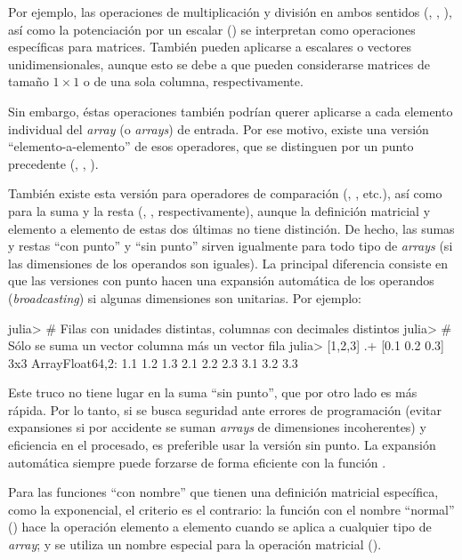 ﻿\documentclass[spanish]{article}
\begin{document}
Por ejemplo, las operaciones de multiplicación y división en ambos
sentidos (\code{*}, \code{/}, \code{\\}
), así como la potenciación por un escalar (\code{^}) se interpretan como
operaciones específicas para matrices. También pueden aplicarse a
escalares o vectores unidimensionales, aunque esto se debe a que pueden
considerarse matrices de tamaño $1\times{}1$ o de una sola columna,
respectivamente.

Sin embargo, éstas operaciones también podrían querer aplicarse a
cada elemento individual del \emph{array} (o \emph{arrays}) de entrada.
Por ese motivo, existe una versión ``elemento-a-elemento'' de
esos operadores, que se distinguen por un punto precedente (,
, ).

También existe esta versión para operadores de comparación (,
, etc.), así como para  la suma y la resta (,
, respectivamente), aunque la definición matricial y elemento
a elemento de estas dos últimas no tiene distinción. De hecho, las sumas y restas ``con
punto'' y ``sin punto'' sirven igualmente para todo tipo de \emph{arrays}
(si las dimensiones de los operandos son iguales). La principal diferencia
consiste en que las versiones con punto hacen una expansión automática
de los operandos (\emph{broadcasting}) si algunas dimensiones son
unitarias. Por ejemplo:

julia> # Filas con unidades distintas, columnas con decimales distintos
julia> # Sólo se suma un vector columna más un vector fila
julia> [1,2,3] .+ [0.1 0.2 0.3]
3x3 Array{Float64,2}:
 1.1 1.2 1.3
 2.1 2.2 2.3
 3.1 3.2 3.3

Este truco no tiene lugar en la suma ``sin punto'', que por otro
lado es más rápida. Por lo tanto, si se busca seguridad ante errores
de programación (evitar expansiones si por accidente se suman \emph{arrays}
de dimensiones incoherentes) y eficiencia en el procesado, es preferible
usar la versión sin punto. La expansión automática siempre puede forzarse
de forma eficiente con la función .

Para las funciones ``con nombre'' que tienen una definición matricial
específica, como la exponencial, el criterio es el contrario: la función
con el nombre ``normal'' () hace la operación elemento
a elemento cuando se aplica a cualquier tipo de \emph{array}; y se
utiliza un nombre especial para la operación matricial ().
\end{document}
